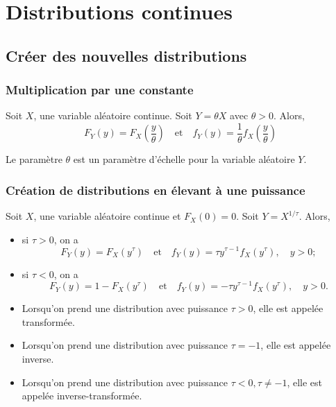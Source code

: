 \chapter{Distributions continues}

\section{Créer des nouvelles distributions}

\subsection{Multiplication par une constante}

\begin{theoreme}{}{}
	Soit $X$, une variable aléatoire continue. Soit $Y = \theta X$ avec $\theta > 0$. Alors, 
	$$F_Y(y) = F_X\left(\frac{y}{\theta}\right) \quad \text{et} \quad f_Y(y) = \frac{1}{\theta} f_X\left(\frac{y}{\theta}\right)$$
\end{theoreme}

Le paramètre $\theta$ est un paramètre d'échelle pour la variable aléatoire $Y.$

\subsection{Création de distributions en élevant à une puissance}

\begin{theoreme}{}{}
	Soit $X$, une variable aléatoire continue et $F_X(0) = 0$. Soit $Y = X^{1/\tau}$. Alors, 
	\begin{itemize}
		\item si $\tau > 0$, on a 
		$$F_Y(y) = F_X\left(y^\tau\right) \quad \text{et} \quad f_Y(y) = \tau y^{\tau - 1} f_{X}\left(y^\tau\right), \quad y>0;$$
		\item si $\tau < 0 $, on a 
		$$F_Y(y) = 1-F_X\left(y^\tau\right) \quad \text{et} \quad f_Y(y) = -\tau y^{\tau - 1} f_{X}\left(y^\tau\right), \quad y>0.$$
	\end{itemize}
\end{theoreme}

\begin{itemize}
	\item Lorsqu'on prend une distribution avec puissance $ \tau > 0$, elle est appelée transformée.
	\item Lorsqu'on prend une distribution avec puissance $ \tau = -1$, elle est appelée inverse.
	\item Lorsqu'on prend une distribution avec puissance $ \tau < 0, \tau \neq -1$, elle est appelée inverse-transformée.
\end{itemize}

